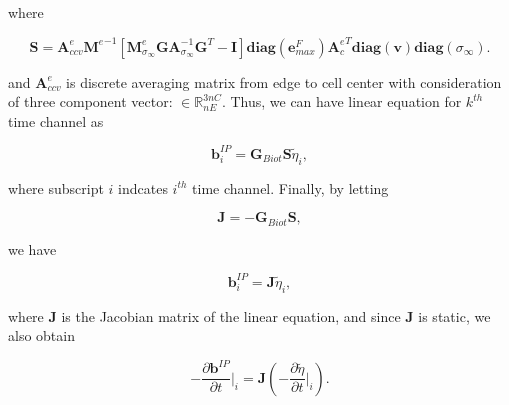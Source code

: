 \documentclass[extra,mreferee]{gji}
\newcommand{\siginf}{\sigma_\infty}
\newcommand{\Ace}{{\mathbf A_c^e}}
\newcommand{\diag}{\mathbf{diag}}
\newcommand{\M}{{\mathbf M}}
\newcommand{\MeSigInf}{{\M^e_{\sigma_\infty}}}
\newcommand{\Me}{{\M^e}}
\newcommand {\db}  { {\mathbf{b} } }
\newcommand {\de}  { {\mathbf{e} } }
\newcommand{\vol}{\mathbf{v}}
\newcommand{\A}{\mathbf{A}}
\newcommand{\Gbiot}{\mathbf{G}_{Biot}}
\newcommand{\peta}{\tilde{\eta}}
\begin{document}
where
\begin{linenomath*}
\begin{equation}
  \mathbf{S} = \mathbf{A}^{e}_{ccv}\Me^{-1}[\MeSigInf \mathbf{G} \A_{\siginf}^{-1}\mathbf{G}^T  - \mathbf{I}] \diag(\de^{F}_{max})\Ace^T\diag(\vol)\diag(\siginf).
\end{equation}
\end{linenomath*}
and $\mathbf{A}^{e}_{ccv}$ is discrete averaging matrix from edge to cell center with consideration of three component vector: $\in \mathbb{R}^{3nC}_{nE}$. 
Thus, we can have linear equation for $k^{th}$ time channel as
\begin{linenomath*}
\begin{equation*}
  \db^{IP}_i = \Gbiot \mathbf{S} \peta_i,
\end{equation*}
\end{linenomath*}
where subscript $i$ indcates $i^{th}$ time channel. Finally, by letting
\begin{linenomath*}
\begin{equation}
  \mathbf{J} = -\Gbiot\mathbf{S},
  \label{eq: Sense}
\end{equation}
\end{linenomath*}
we have
\begin{linenomath*}
\begin{equation}
  \db^{IP}_i = \mathbf{J}\peta_i,
  \label{eq: bIP_linear}
\end{equation}
\end{linenomath*}
where $\mathbf{J}$ is the Jacobian matrix of the linear equation, and since $\mathbf{J}$ is static, we also obtain
\begin{linenomath*}
\begin{equation}
  -\frac{\partial\db^{IP}}{\partial t}\Big|_i = \mathbf{J}(-\frac{\partial \peta}{\partial t}\Big|_i).
  \label{eq: dbIPdt_linear}
\end{equation}
\end{linenomath*}



\end{document}
